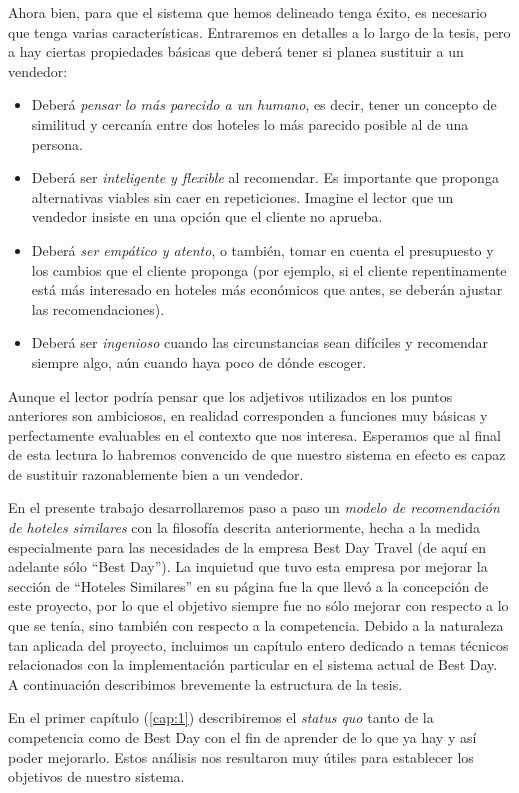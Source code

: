\documentclass[12pt]{report}
\begin{document}
Ahora bien, para que el sistema que hemos delineado tenga éxito, es necesario que tenga varias características. Entraremos en detalles a lo largo de la tesis, pero a hay ciertas propiedades básicas que deberá tener si planea sustituir a un vendedor:
\begin{itemize}
	\item Deberá \emph{pensar lo más parecido a un humano}, es decir, tener un concepto de similitud y cercanía entre dos hoteles lo más parecido posible al de una persona.
	\item Deberá ser \emph{inteligente y flexible} al recomendar. Es importante que proponga alternativas viables sin caer en repeticiones. Imagine el lector que un vendedor insiste en una opción que el cliente no aprueba.
	\item Deberá \emph{ser empático y atento}, o también, tomar en cuenta el presupuesto y los cambios que el cliente proponga (por ejemplo, si el cliente repentinamente está más interesado en hoteles más económicos que antes, se deberán ajustar las recomendaciones).
	\item Deberá ser \emph{ingenioso} cuando las circunstancias sean difíciles y recomendar siempre algo, aún cuando haya poco de dónde escoger.
\end{itemize}
Aunque el lector podría pensar que los adjetivos utilizados en los puntos anteriores son ambiciosos, en realidad corresponden a funciones muy básicas y perfectamente evaluables en el contexto que nos interesa. Esperamos que al final de esta lectura lo habremos convencido de que nuestro sistema en efecto es capaz de sustituir razonablemente bien a un vendedor.

En el presente trabajo desarrollaremos paso a paso un \emph{modelo de recomendación de hoteles similares} con la filosofía descrita anteriormente, hecha a la medida especialmente para las necesidades de la empresa Best Day Travel (de aquí en adelante sólo ``Best Day''). La inquietud que tuvo esta empresa por mejorar la sección de ``Hoteles Similares'' en su página fue la que llevó a la concepción de este proyecto, por lo que el objetivo siempre fue no sólo mejorar con respecto a lo que se tenía, sino también con respecto a la competencia. Debido a la naturaleza tan aplicada del proyecto, incluimos un capítulo entero dedicado a temas técnicos relacionados con la implementación particular en el sistema actual de Best Day. A continuación describimos brevemente la estructura de la tesis.

En el primer capítulo (\ref{cap:1}) describiremos el \emph{status quo} tanto de la competencia como de Best Day con el fin de aprender de lo que ya hay y así poder mejorarlo. Estos análisis nos resultaron muy útiles para establecer los objetivos de nuestro sistema.
\end{document}
